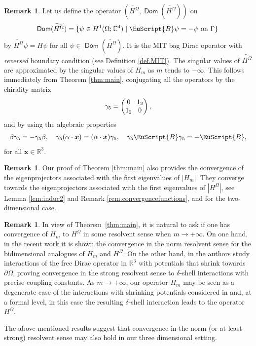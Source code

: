 \documentclass[JEP,XML,SOM,Unicode]{cedram}
\let\mathcal \EuScript
\newcommand{\cB}{\mathcal{B}}
\let\sep\mid
\theoremstyle{plain}
\theoremstyle{definition}
\newtheorem{remark}[theorem]{Remark}
\newcommand{\RR}{\mathbb{R}}
\newcommand{\bx}{{\boldsymbol x}}
\DeclareMathOperator{\Dom}{\mathsf{Dom}}
\begin{document}
\begin{remark}\label{rem.opplimit}
Let us define the operator $(\widetilde{H^\Omega},\Dom(\widetilde{H^\Omega}))$ on
\[
\Dom(\widetilde{H^\Omega}) = \{\psi\in H^1(\Omega;\mathbb{C}^4)\sep\cB\psi = -\psi~\text{on}~\Gamma\}\,
\]
by $\widetilde{H^\Omega}\psi=H\psi$ for all $\psi\in\Dom(\widetilde{H^\Omega})$. It is the MIT bag Dirac operator with \emph{reversed} boundary condition (see Definition \ref{def.MIT}). The singular values of $\widetilde{H^\Omega}$ are approximated by the singular values of $H_m$ as $m$ tends to $-\infty$. This follows immediately from Theorem \ref{thm:main}, conjugating all the operators by the chirality matrix
\[\arraycolsep3.5pt
\gamma_5=\begin{pmatrix}0&1_2\\1_2&0\end{pmatrix},
\]
and by using the algebraic properties
\begin{equation*}
\begin{split}
\beta \gamma_5 = -\gamma_5\beta,\quad
\gamma_5(\alpha\cdot \bx) = (\alpha\cdot \bx)\gamma_5,\quad
\gamma_5\cB\gamma_5 = -\cB,
\end{split}
\end{equation*}
for all $\bx\in\RR^3$.
\end{remark}
\begin{remark}
Our proof of Theorem \ref{thm:main} also provides the convergence of the eigenprojectors associated with the first eigenvalues of $|H_m|$. They converge towards the eigenprojectors associated with the first eigenvalues of $|H^\Omega|$, see Lemma \ref{lem:induc2} and Remark \ref{rem.convergencefunctions}, and \cite[Th.\,1]{stockmeyer2016infinite} for the two-dimensional case.
\end{remark}
\begin{remark}
In view of Theorem~\ref{thm:main}, it is natural to ask if one has convergence of $H_m$ to $H^\Omega$ in some resolvent sense when $m\to+\infty$. On one hand, in the recent work \cite{barbaroux2018normconvergence} it is shown the convergence in the norm resolvent sense for the bidimensional analogues of $H_m$ and $H^\Omega$. On the other hand, in \cite{maspizzichillo2018} the authors study interactions of the free Dirac operator in $\RR^3$ with potentials that shrink towards $\partial\Omega$, proving convergence in the strong resolvent sense to $\delta$-shell interactions with precise coupling constants. As $m\to+\infty$, our operator $H_m$ may be seen as a degenerate case of the interactions with shrinking potentials considered in \cite{maspizzichillo2018} and, at a formal level, in this case the resulting $\delta$-shell interaction leads to the operator $H^\Omega$.

The above-mentioned results suggest that convergence in the norm (or at least strong) resolvent sense may also hold in our three dimensional setting.
\end{remark}
\end{document}
